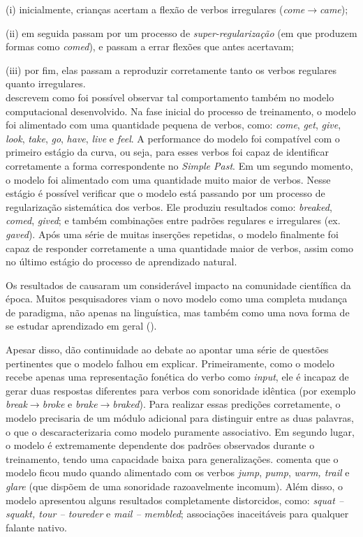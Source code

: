 (i) inicialmente, crianças acertam a flexão de verbos irregulares (\textit{come}$\rightarrow$\textit{came});

(ii) em seguida passam por um processo de \textit{super-regularização} (em que produzem formas como \textit{comed}), e passam a errar flexões que antes acertavam;

(iii) por fim, elas passam a reproduzir corretamente tanto os verbos regulares quanto irregulares. \\


\cite{rumelhart:1986} descrevem como foi possível observar tal comportamento também no modelo computacional desenvolvido.
Na fase inicial do processo de treinamento, o modelo foi alimentado com uma quantidade pequena de verbos, como: \textit{come}, \textit{get}, \textit{give}, \textit{look}, \textit{take}, \textit{go}, \textit{have}, \textit{live} e \textit{feel}. A performance do modelo foi compatível com o primeiro estágio da curva, ou seja, para esses verbos foi capaz de identificar corretamente a forma correspondente no \textit{Simple Past}. Em um segundo momento, o modelo foi alimentado com uma quantidade muito maior de verbos. Nesse estágio é possível verificar que o modelo está passando por um processo de regularização sistemática dos verbos. Ele produziu resultados como: \textit{breaked}, \textit{comed}, \textit{gived}; e também combinações entre padrões regulares e irregulares (ex. \textit{gaved}). 
Após uma série de muitas inserções repetidas, o modelo finalmente foi capaz de responder corretamente a uma quantidade maior de verbos, assim como no último estágio do processo de aprendizado natural. 

Os resultados de \cite{rumelhart:1986} causaram um considerável impacto na comunidade científica da época. Muitos pesquisadores viam o novo modelo como uma completa mudança de paradigma, não apenas na linguística, mas também como uma nova forma de se estudar aprendizado em geral (\cite{Schneider1987}). 

Apesar disso, \cite{Pinker:1988} dão continuidade ao debate ao apontar uma série de questões pertinentes que o modelo falhou em explicar. Primeiramente, como o modelo recebe apenas uma representação fonética do verbo como \textit{input}, ele é incapaz de gerar duas respostas diferentes para verbos com sonoridade idêntica (por exemplo \textit{break}$\rightarrow$\textit{broke} e \textit{brake}$\rightarrow$\textit{braked}). Para realizar essas predições corretamente, o modelo precisaria de um módulo adicional para distinguir entre as duas palavras, o que o descaracterizaria como modelo puramente associativo. Em segundo lugar, o modelo é extremamente dependente dos padrões observados durante o treinamento, tendo uma capacidade baixa para generalizações. \cite{Pinker:1999} comenta que o modelo ficou mudo quando alimentado com os verbos \textit{jump}, \textit{pump}, \textit{warm, trail} e \textit{glare} (que dispõem de uma sonoridade razoavelmente incomum). Além disso, o modelo apresentou alguns resultados completamente distorcidos, como: \textit{squat – squakt, tour – toureder} e \textit{mail – membled}; associações inaceitáveis para qualquer falante nativo. 

